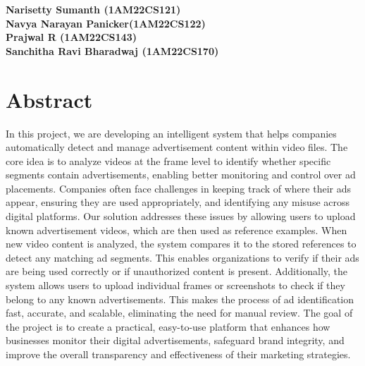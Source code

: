 \documentclass[a4paper, 12pt]{report}
\begin{document}
\vspace{0.2cm}

\begin{flushright}
    \textbf{Narisetty Sumanth (1AM22CS121)}\\
    \textbf{Navya Narayan Panicker(1AM22CS122)}\\
    \textbf{Prajwal R (1AM22CS143)}\\
    \textbf{Sanchitha Ravi Bharadwaj (1AM22CS170)}\\
\end{flushright}


\chapter*{Abstract}
\thispagestyle{borderedpage}
In this project, we are developing an intelligent system that helps companies automatically detect and manage advertisement content within video files. The core idea is to analyze videos at the frame level to identify whether specific segments contain advertisements, enabling better monitoring and control over ad placements. Companies often face challenges in keeping track of where their ads appear, ensuring they are used appropriately, and identifying any misuse across digital platforms. Our solution addresses these issues by allowing users to upload known advertisement videos, which are then used as reference examples. When new video content is analyzed, the system compares it to the stored references to detect any matching ad segments. This enables organizations to verify if their ads are being used correctly or if unauthorized content is present. Additionally, the system allows users to upload individual frames or screenshots to check if they belong to any known advertisements. This makes the process of ad identification fast, accurate, and scalable, eliminating the need for manual review. The goal of the project is to create a practical, easy-to-use platform that enhances how businesses monitor their digital advertisements, safeguard brand integrity, and improve the overall transparency and effectiveness of their marketing strategies.

\newpage

\pagestyle{borderedpage}

\tableofcontents
\thispagestyle{titlepagelayout}
\newpage

{
\doublespacing
\listoffigures
\thispagestyle{titlepagelayout}
\newpage
\doublespacing
\listoftables
\thispagestyle{titlepagelayout}
\newpage
\restoregeometry
}
\end{document}
